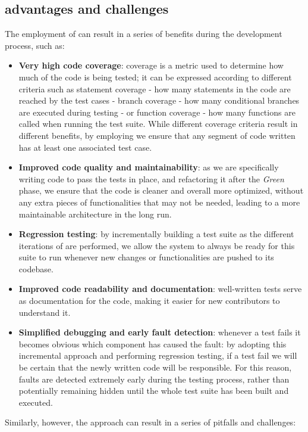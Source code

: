 \subsection{\tdd advantages and challenges}
The employment of \tdd can result in a series of benefits during the development process, such as:
\begin{itemize}
    \item \textbf{Very high code coverage}: coverage is a metric used to determine how much of the code is being tested; it can be expressed according to different criteria such as statement coverage - \ie how many statements in the code are reached by the test cases - branch coverage - \ie how many conditional branches are executed during testing - or function coverage - \ie how many functions are called when running the test suite. While different coverage criteria result in different benefits, by employing \tdd we ensure that any segment of code written has at least one associated test case.
    \item \textbf{Improved code quality and maintainability}: as we are specifically writing code to pass the tests in place, and refactoring it after the \textit{Green} phase, we ensure that the code is cleaner and overall more optimized, without any extra pieces of functionalities that may not be needed, leading to a more maintainable architecture in the long run.
    \item \textbf{Regression testing}: by incrementally building a test suite as the different iterations of \tdd are performed, we allow the system to always be ready for this suite to run whenever new changes or functionalities are pushed to its codebase.
    \item \textbf{Improved code readability and documentation}: well-written tests serve as documentation for the code, making it easier for new contributors to understand it.
    \item \textbf{Simplified debugging and early fault detection}: whenever a test fails it becomes obvious which component has caused the fault: by adopting this incremental approach and performing regression testing, if a test fail we will be certain that the newly written code will be responsible. For this reason, faults are detected extremely early during the testing process, rather than potentially remaining hidden until the whole test suite has been built and executed.
\end{itemize}
Similarly, however, the \tdd approach can result in a series of pitfalls and challenges:
